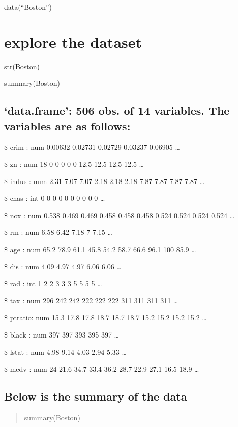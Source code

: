 \documentclass[]{article}
\begin{document}
data(``Boston'')

\section{explore the dataset}\label{explore-the-dataset}

str(Boston)

summary(Boston)

\subsection{\texorpdfstring{`data.frame': 506 obs. of 14 variables. The
variables are as
follows:}{data.frame: 506 obs. of 14 variables. The variables are as follows:}}\label{data.frame-506-obs.-of-14-variables.-the-variables-are-as-follows}

\$ crim : num 0.00632 0.02731 0.02729 0.03237 0.06905 \ldots{}

\$ zn : num 18 0 0 0 0 0 12.5 12.5 12.5 12.5 \ldots{}

\$ indus : num 2.31 7.07 7.07 2.18 2.18 2.18 7.87 7.87 7.87 7.87
\ldots{}

\$ chas : int 0 0 0 0 0 0 0 0 0 0 \ldots{}

\$ nox : num 0.538 0.469 0.469 0.458 0.458 0.458 0.524 0.524 0.524 0.524
\ldots{}

\$ rm : num 6.58 6.42 7.18 7 7.15 \ldots{}

\$ age : num 65.2 78.9 61.1 45.8 54.2 58.7 66.6 96.1 100 85.9 \ldots{}

\$ dis : num 4.09 4.97 4.97 6.06 6.06 \ldots{}

\$ rad : int 1 2 2 3 3 3 5 5 5 5 \ldots{}

\$ tax : num 296 242 242 222 222 222 311 311 311 311 \ldots{}

\$ ptratio: num 15.3 17.8 17.8 18.7 18.7 18.7 15.2 15.2 15.2 15.2
\ldots{}

\$ black : num 397 397 393 395 397 \ldots{}

\$ lstat : num 4.98 9.14 4.03 2.94 5.33 \ldots{}

\$ medv : num 24 21.6 34.7 33.4 36.2 28.7 22.9 27.1 16.5 18.9 \ldots{}

\subsection{Below is the summary of the
data}\label{below-is-the-summary-of-the-data}

\begin{quote}
summary(Boston)
\end{quote}
\end{document}
